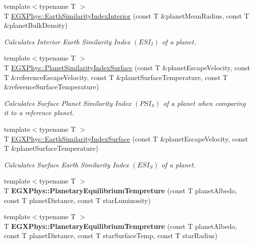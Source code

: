 \begin{DoxyCompactItemize}
{\footnotesize template$<$typename T $>$ }\\T \mbox{\hyperlink{group___e_g_x_phys-_planet_criteria_ga699bcc2f17b8855eaa856595d8032f61}{E\+G\+X\+Phys\+::\+Earth\+Similarity\+Index\+Interior}} (const T \&planet\+Mean\+Radius, const T \&planet\+Bulk\+Density)
\begin{DoxyCompactList}\small\item\em Calculates Interior Earth Similarity Index $(ESI_I)$ of a planet. \end{DoxyCompactList}\item 
{\footnotesize template$<$typename T $>$ }\\T \mbox{\hyperlink{group___e_g_x_phys-_planet_criteria_gae0c7dce2779d66b0560ca388a34ddc39}{E\+G\+X\+Phys\+::\+Planet\+Similarity\+Index\+Surface}} (const T \&planet\+Escape\+Velocity, const T \&reference\+Escape\+Velocity, const T \&planet\+Surface\+Temperature, const T \&reference\+Surface\+Temperature)
\begin{DoxyCompactList}\small\item\em Calculates Surface Planet Similarity Index $(PSI_S)$ of a planet when comparing it to a reference planet. \end{DoxyCompactList}\item 
{\footnotesize template$<$typename T $>$ }\\T \mbox{\hyperlink{group___e_g_x_phys-_planet_criteria_ga1df772b0ed354ca7f7e4a7a4af072325}{E\+G\+X\+Phys\+::\+Earth\+Similarity\+Index\+Surface}} (const T \&planet\+Escape\+Velocity, const T \&planet\+Surface\+Temperature)
\begin{DoxyCompactList}\small\item\em Calculates Surface Earth Similarity Index $(ESI_S)$ of a planet. \end{DoxyCompactList}\item 
\mbox{\label{group___e_g_x_phys-_planet_criteria_gaeac3ced5104701ee02fc100f7cf4c189}} 
{\footnotesize template$<$typename T $>$ }\\T {\bfseries E\+G\+X\+Phys\+::\+Planetary\+Equilibrium\+Tempreture} (const T planet\+Albedo, const T planet\+Distance, const T star\+Luminosity)
\item 
\mbox{\label{group___e_g_x_phys-_planet_criteria_ga099c12876fba6deb13ae2cf0e92644fe}} 
{\footnotesize template$<$typename T $>$ }\\T {\bfseries E\+G\+X\+Phys\+::\+Planetary\+Equilibrium\+Tempreture} (const T planet\+Albedo, const T planet\+Distance, const T star\+Surface\+Temp, const T star\+Radius)

\end{DoxyCompactItemize}
